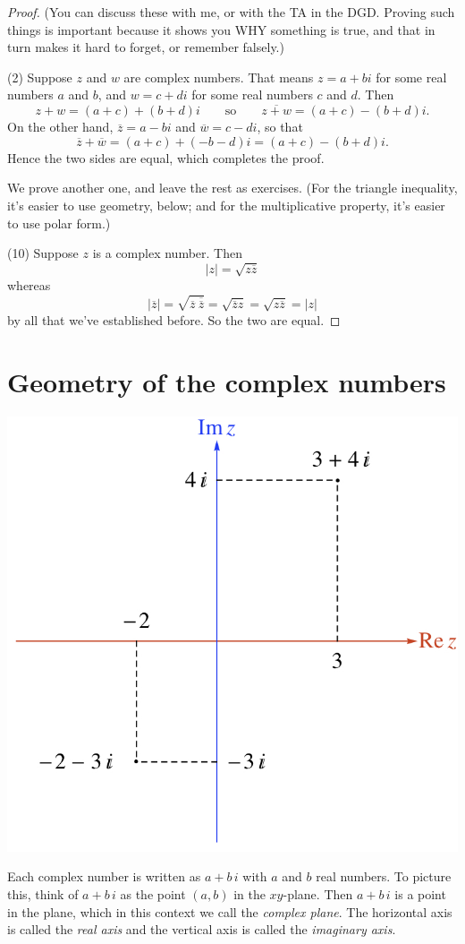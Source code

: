 \begin{proof}
(You can discuss these with me, or with the TA in the DGD.
Proving such things is important because it shows you WHY 
something is true, and that in turn makes it hard to forget, 
or remember falsely.)

(2) Suppose $z$ and $w$ are complex numbers.  
That means
$z = a+bi$ for some real numbers $a$ and $b$, and $w = c+di$
for some real numbers $c$ and $d$.
Then $$z+w = (a+c) + (b+d)i \qquad \text{so} \qquad \overline{z+w} = (a+c) - (b+d)i.$$
On the other hand, $\overline{z} = a-bi$ and $\overline{w} = c-di$,
so that $$\overline{z} + \overline{w} = (a+c)+(-b-d)i = (a+c)-(b+d)i.$$
Hence the two sides are equal, which completes the proof.

We prove another one,  and leave the rest as exercises.  
(For the triangle inequality, it's easier to use geometry, below;
and for the multiplicative property, it's easier to use
polar form.)

(10) Suppose $z$ is a complex number.  Then 
$$
\vert z \vert = \sqrt{z \overline{z}}
$$ 
whereas 
$$
\vert \overline{z} \vert = \sqrt{\overline{z} \ \overline{\overline{z}}}  = \sqrt{\overline{z} z }= \sqrt{ z \overline{z} }= \vert z \vert
$$ 
by all that we've established before.  So the two are equal.
\end{proof}


\section{Geometry of the complex numbers}  

\begin{center}
\includegraphics[scale=.6]{img/complexplane.jpg}
\end{center}
Each complex number
is written as $a+b\,i$ with $a$ and $b$ real numbers.  To picture
this, think of $a+b\,i$ as the point $(a,b)$ in the $xy$-plane.
Then $a+b\,i$ is a point in the plane, which in this context
we call the \emph{complex plane}.  The horizontal axis is called
the \emph{real axis} and the vertical axis 
is called the \emph{imaginary axis}.

